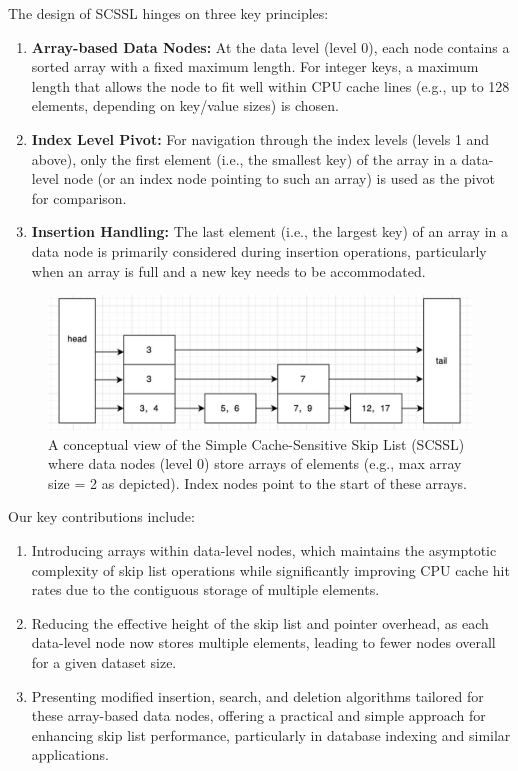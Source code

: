 \documentclass{article}
\begin{document}
The design of SCSSL hinges on three key principles:
\begin{enumerate}
    \item \textbf{Array-based Data Nodes:} At the data level (level 0), each node contains a sorted array with a fixed maximum length. For integer keys, a maximum length that allows the node to fit well within CPU cache lines (e.g., up to 128 elements, depending on key/value sizes) is chosen.
    \item \textbf{Index Level Pivot:} For navigation through the index levels (levels 1 and above), only the first element (i.e., the smallest key) of the array in a data-level node (or an index node pointing to such an array) is used as the pivot for comparison.
    \item \textbf{Insertion Handling:} The last element (i.e., the largest key) of an array in a data node is primarily considered during insertion operations, particularly when an array is full and a new key needs to be accommodated.
\end{enumerate}

\begin{figure}[htbp]
\centering
\includegraphics[width=0.7\linewidth]{skiplist.png} %
\caption{A conceptual view of the Simple Cache-Sensitive Skip List (SCSSL) where data nodes (level 0) store arrays of elements (e.g., max array size = 2 as depicted). Index nodes point to the start of these arrays.}
\label{fig:conceptual_scssl}
\end{figure}

Our key contributions include:
\begin{enumerate}
    \item Introducing arrays within data-level nodes, which maintains the asymptotic complexity of skip list operations while significantly improving CPU cache hit rates due to the contiguous storage of multiple elements.
    \item Reducing the effective height of the skip list and pointer overhead, as each data-level node now stores multiple elements, leading to fewer nodes overall for a given dataset size.
    \item Presenting modified insertion, search, and deletion algorithms tailored for these array-based data nodes, offering a practical and simple approach for enhancing skip list performance, particularly in database indexing and similar applications.
\end{enumerate}
\end{document}
